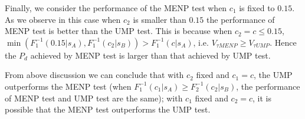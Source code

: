 Finally, we consider the performance of the MENP test when $c_1$ is fixed to $0.15$. As we observe in this case when $c_2$ is smaller than $0.15$ the performance of MENP test is better than the UMP test. This is because when $c_2 = c  \leq 0.15$, $\min (F_1^{-1}(0.15|s_A), F_1^{-1}(c_2|s_B)) > F_1^{-1}(c|s_A)$, i.e. $V_{\tau MENP} \geq V_{\tau UMP }$.   Hence the $P_d$ achieved by MENP test is larger than that achieved by UMP test. 


From above discussion we can conclude that with $c_2$ fixed and $c_1 = c$, the UMP outperforms the MENP test (when $F_1^{-1}(c_1|s_A) \geq F_2^{-1}(c_2|s_B)$, the performance of MENP test and UMP test are the same); with $c_1$ fixed and $c_2  = c$, it is possible that the MENP test outperforms the UMP test.    

\typeout{}

